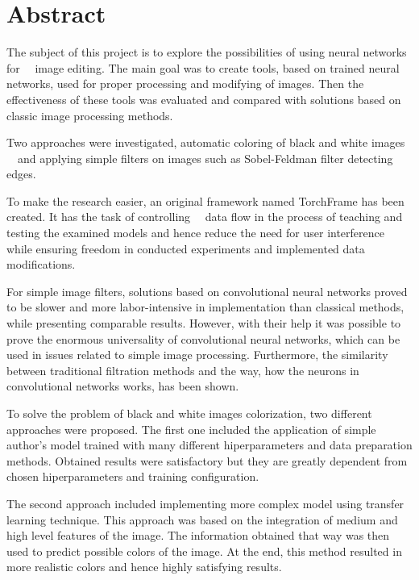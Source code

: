 \section*{Abstract}

  The subject of this project is to explore the possibilities of using neural networks for
  image editing. The main goal was to create tools, based on
  trained neural networks, used for proper processing and modifying of
  images. Then the effectiveness of these tools was evaluated and
  compared with solutions based on classic image processing methods.

  Two approaches were investigated, automatic coloring of black and white images
  and applying simple filters on images such as Sobel-Feldman filter detecting edges.

  To make the research easier, an original framework named TorchFrame has been created.
  It has the task of controlling
  data flow in the process of teaching and testing the examined models and hence
  reduce the need for user interference while ensuring freedom
  in conducted experiments and implemented data modifications.

  For simple image filters, solutions based on convolutional neural networks proved to
  be slower and more labor-intensive in implementation than classical methods,
  while presenting comparable results.
  However, with their help it was possible to prove the enormous universality
  of convolutional neural networks, which can be used in issues related to
  simple image processing. Furthermore, the similarity between traditional filtration
  methods and the way, how the neurons in convolutional networks works, has been shown.

  To solve the problem of black and white images colorization, two different
  approaches were proposed. The first one included the application of simple author's
  model trained with many different hiperparameters and data preparation methods.
  Obtained results were satisfactory but they are greatly dependent from chosen
  hiperparameters and training configuration.

  The second approach included implementing more complex model using transfer
  learning technique. This approach was based on the integration of medium
  and high level features of the image. The information obtained that way was
  then used to predict possible colors of the image.
  At the end, this method resulted in more realistic colors and hence
  highly satisfying results.

